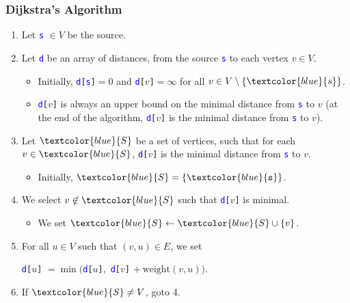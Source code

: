 \documentclass{beamer}
\begin{document}
\begin{frame}%
\frametitle{Dijkstra's Algorithm}

\hypertarget{slide:dijkstra_algorithm}{}

\begin{enumerate}

\item Let \textcolor{blue}{\texttt{s}} $\in V$ be the source.

\item<2-> Let \textcolor{blue}{\texttt{d}} be an array of distances, from the source \textcolor{blue}{\texttt{s}} to each vertex $v \in V$.

\begin{itemize}
\item<3-> Initially, \textcolor{blue}{\texttt{d}}\texttt{[}\textcolor{blue}{\texttt{s}}\texttt{]}$ = 0$ and
\textcolor{blue}{\texttt{d}}\texttt{[}$v$\texttt{]}$ = \infty$ for all $v \in V \setminus \{\textcolor{blue}{s}\}$.

\item<4-> \textcolor{blue}{\texttt{d}}\texttt{[}$v$\texttt{]} is always an upper bound on the minimal distance from
\textcolor{blue}{\texttt{s}} to $v$ (at the end of the algorithm, \textcolor{blue}{\texttt{d}}\texttt{[}$v$\texttt{]} is the minimal distance
from \textcolor{blue}{\texttt{s}} to $v$).

\end{itemize}

\item<5-> Let $\textcolor{blue}{S}$ be a set of vertices, such that for each $v \in \textcolor{blue}{S}$, \textcolor{blue}{\texttt{d}}\texttt{[}$v$\texttt{]}
is the minimal distance from \textcolor{blue}{\texttt{s}} to $v$.
\begin{itemize}
\item<6-> Initially, $\textcolor{blue}{S} = \{\textcolor{blue}{\texttt{s}}\}$.
\end{itemize}

\item<7-> We select $v \not\in \textcolor{blue}{S}$ such that \textcolor{blue}{\texttt{d}}\texttt{[}$v$\texttt{]} is minimal.
\begin{itemize}
\item<8-> We set $\textcolor{blue}{S} \leftarrow \textcolor{blue}{S} \cup \{ v \}$.
\end{itemize}
\item<9-> For all $u \in V$ such that $(v, u) \in E$, we set\\
\begin{center}
\textcolor{blue}{\texttt{d}}\texttt{[}$u$\texttt{]} $= \min($\textcolor{blue}{\texttt{d}}\texttt{[}$u$\texttt{]}$,$ \textcolor{blue}{\texttt{d}}\texttt{[}$v$\texttt{]}
$+\ \textrm{weight}(v, u))$.
\end{center}

\item<10-> If $\textcolor{blue}{S} \ne V$, goto 4.

\end{enumerate}

\end{frame}
\end{document}
